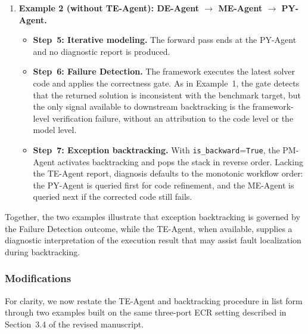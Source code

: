 \documentclass[11pt,a4paper]{article}
\begin{document}
\begin{enumerate}
\item \textbf{Example 2 (without TE-Agent): DE-Agent $\rightarrow$ ME-Agent $\rightarrow$ PY-Agent.}
\begin{itemize}
\item \textbf{Step~5: Iterative modeling.} The forward pass ends at the PY-Agent and no diagnostic report is produced.
\item \textbf{Step~6: Failure Detection.} The framework executes the latest solver code and applies the correctness gate. As in Example~1, the gate detects that the returned solution is inconsistent with the benchmark target, but the only signal available to downstream backtracking is the framework-level verification failure, without an attribution to the code level or the model level.
\item \textbf{Step~7: Exception backtracking.} With \texttt{is\_backward}=\texttt{True}, the PM-Agent activates backtracking and pops the stack in reverse order. Lacking the TE-Agent report, diagnosis defaults to the monotonic workflow order: the PY-Agent is queried first for code refinement, and the ME-Agent is queried next if the corrected code still fails.
\end{itemize}
\end{enumerate}

Together, the two examples illustrate that exception backtracking is governed by the Failure Detection outcome, while the TE-Agent, when available, supplies a diagnostic interpretation of the execution result that may assist fault localization during backtracking.

\subsubsection{Modifications}
For clarity, we now restate the TE-Agent and backtracking procedure in list form through two examples built on the same three-port ECR setting described in Section~3.4 of the revised manuscript.
\end{document}
